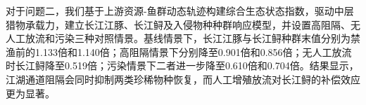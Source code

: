 对于问题二，我们基于上游资源-鱼群动态轨迹构建综合生态状态指数，驱动中层猎物承载力，建立长江江豚、长江鲟及入侵物种种群响应模型，并设置高阻隔、无人工放流和污染三种对照情景。基线情景下，长江江豚与长江鲟种群末值分别为禁渔前的1.133倍和1.140倍；高阻隔情景下分别降至0.901倍和0.856倍；无人工放流时长江鲟降至0.519倍；污染情景下二者进一步降至0.610倍和0.704倍。结果显示，江湖通道阻隔会同时抑制两类珍稀物种恢复，而人工增殖放流对长江鲟的补偿效应更为显著。
